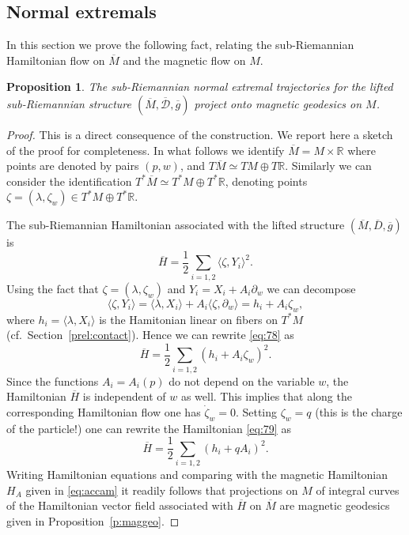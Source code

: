 \documentclass{amsart}
\theoremstyle{plain}
\newtheorem{proposition}[theorem]{Proposition}
\theoremstyle{definition}
\theoremstyle{remark}
\newcommand{\R}{\mathbb{R}}
\newcommand{\sr}{sub-{R}ie\-man\-nian }
\newcommand{\distr}{\mathcal{D}}								%
\newcommand{\lift}[1]{\overline{#1}} 							%
\begin{document}
\subsection{Normal extremals} In this section we prove the following fact, relating the \sr Hamiltonian flow on $\lift M$ and the magnetic flow on $M$.
\begin{proposition} \label{p:normal}
The \sr normal extremal trajectories for the lifted \sr structure $(\lift M, \lift \distr, \lift g)$ project onto magnetic geodesics on $M$.
\end{proposition}
\begin{proof} This is a direct consequence of the construction. We report here a sketch of the proof for completeness.  
In what follows we identify $\lift M=M\times \R$ where points are denoted by pairs $(p,w)$, and $T \lift M\simeq  TM \oplus T\R$. Similarly we can consider the identification $T^{*}\lift M\simeq  T^{*}M \oplus T^{*}\R$, denoting points $\zeta=(\lambda,\zeta_{w})\in T^{*}M \oplus T^{*}\R$.

The sub-Riemannian Hamiltonian associated with the lifted structure $(\lift M, \lift D, \lift g)$ is
\begin{equation}\label{eq:78}
\lift H=\frac{1}{2}\sum_{i=1,2}\langle\zeta,Y_{i}\rangle^{2}.
\end{equation}
Using the fact that $\zeta=(\lambda,\zeta_{w})$ and $Y_{i}=X_{i}+A_{i}\partial_{w}$ we can decompose
$$\langle\zeta,Y_{i}\rangle=\langle\lambda,X_{i}\rangle+A_{i}\langle \zeta, \partial_{w}\rangle=h_{i}+A_{i}\zeta_{w},$$
where $h_{i}=\langle\lambda,X_{i}\rangle$ is the Hamitonian linear on fibers on $T^{*}M$ (cf.\ Section~\ref{prel:contact}).
Hence we can rewrite \eqref{eq:78} as
\begin{equation}\label{eq:79}
\lift H=\frac{1}{2}\sum_{i=1,2} (h_{i}+A_{i}\zeta_{w})^{2}.
\end{equation}
Since the functions $A_{i}=A_{i}(p)$ do not depend on the variable $w$, the Hamiltonian $\lift H$ is independent of $w$ as well. This implies that along the corresponding Hamiltonian flow one has $\dot \zeta_{w}=0$. Setting $\zeta_{w}=q$ (this is the charge of the particle!) one can rewrite the Hamiltonian \eqref{eq:79} as
\begin{equation}
\lift H=\frac{1}{2}\sum_{i=1,2} (h_{i}+qA_{i})^{2}.
\end{equation}
Writing Hamiltonian equations and comparing with the magnetic Hamiltonian $H_{A}$ given in \eqref{eq:accam} it readily follows that projections on $M$ of integral curves of the Hamiltonian vector field associated with $\lift H$ on $\lift M$ are magnetic geodesics given in Proposition~\ref{p:maggeo}.
\end{proof}
\end{document}
